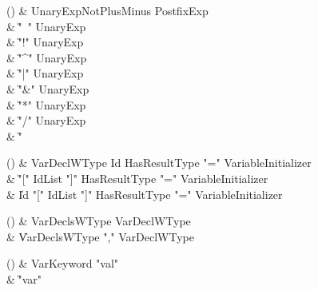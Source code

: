 \begin{bbgrammarappendix}{3.0in}

() & UnaryExpNotPlusMinus \label{prod:UnaryExpNotPlusMinus}  \: PostfixExp  \\

 &    \| \xcd"~" UnaryExp \\
 &    \| \xcd"!" UnaryExp \\
 &    \| \xcd"^" UnaryExp \\
 &    \| \xcd"|" UnaryExp \\
 &    \| \xcd"&" UnaryExp \\
 &    \| \xcd"*" UnaryExp \\
 &    \| \xcd"/" UnaryExp \\
 &    \| \xcd"%

\end{bbgrammarappendix}

\begin{bbgrammarappendix}{3.8in}

() & VarDeclWType \label{prod:VarDeclWType}  \: Id HasResultType \xcd"=" VariableInitializer  \\

 &    \| \xcd"[" IdList \xcd"]" HasResultType \xcd"=" VariableInitializer \\
 &    \| Id \xcd"[" IdList \xcd"]" HasResultType \xcd"=" VariableInitializer \\

\end{bbgrammarappendix}

\begin{bbgrammarappendix}{3.7in}

() & VarDeclsWType \label{prod:VarDeclsWType}  \: VarDeclWType  \\

 &    \| VarDeclsWType \xcd"," VarDeclWType \\

\end{bbgrammarappendix}

\begin{bbgrammarappendix}{4.0in}

() & VarKeyword \label{prod:VarKeyword}  \: \xcd"val"  \\

 &    \| \xcd"var" \\

\end{bbgrammarappendix}

